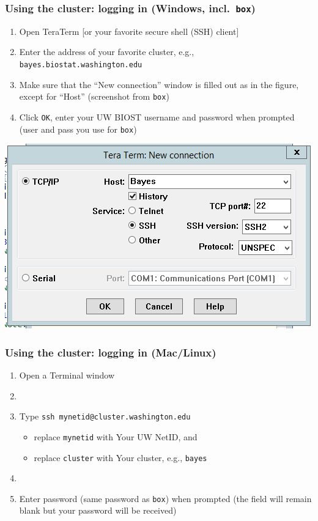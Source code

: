 \documentclass[12pt, 
hyperref={colorlinks=true, linkcolor=BlueViolet, urlcolor=BlueViolet},dvipsnames]{beamer}
\begin{document}
\begin{frame}
\frametitle{Using the cluster: logging in (Windows, incl.~\texttt{box})}
\begin{enumerate}
\item Open TeraTerm [or your favorite secure shell (SSH) client]
\item Enter the address of your favorite cluster, e.g., \texttt{bayes.biostat.washington.edu}
\item Make sure that the ``New connection'' window is filled out as in the figure, except for ``Host'' (screenshot from \texttt{box})
\item Click \texttt{OK}, enter your UW BIOST username and password when prompted (user and pass you use for \texttt{box}) 
\end{enumerate}
\centering
\includegraphics[width = .45\textwidth]{plots/tera_term_example.png}
\end{frame}

\begin{frame}
\frametitle{Using the cluster: logging in (Mac/Linux)}
\begin{enumerate}
\item Open a Terminal window
\item[]
\item Type \texttt{ssh mynetid@cluster.washington.edu}
\begin{itemize}
\item replace \texttt{mynetid} with Your UW NetID, and 
\item replace \texttt{cluster} with Your cluster, e.g., \texttt{bayes}
\end{itemize} 
\item[]
\item Enter password (same password as \texttt{box}) when prompted (the field will remain blank but your password will be received)
\end{enumerate}

\end{frame}
\end{document}
